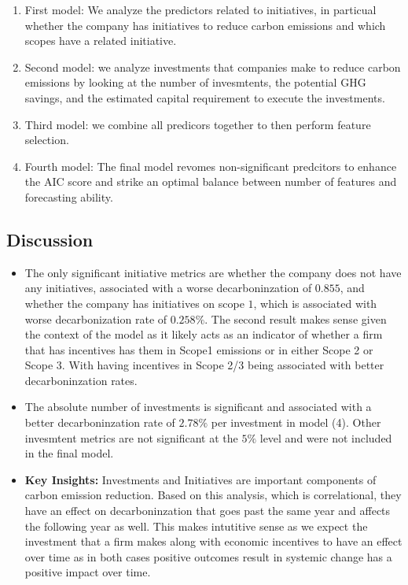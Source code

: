 \begin{enumerate}
    \item First model: We analyze the predictors related to initiatives, in particual whether the company has initiatives to reduce carbon emissions and which scopes have a related initiative. 
    \item Second model: we analyze investments that companies make to reduce carbon emissions by looking at the number of invesmtents, the potential GHG savings, and the estimated capital requirement to execute the investments.
    \item Third model: we combine all predicors together to then perform feature selection.
    \item Fourth model: The final model revomes non-significant predcitors to enhance the AIC score and strike an optimal balance between number of features and forecasting ability.
\end{enumerate}




\subsection{Discussion}

\begin{itemize}
    \item The only significant initiative metrics are whether the company does not have any initiatives, associated with a worse decarboninzation of $0.855$, and whether the company has initiatives on scope $1$, which is associated with worse decarbonization rate of $0.258\%$. The second result makes sense given the context of the model as it likely acts as an indicator of whether a firm that has incentives has them in Scope1 emissions or in either Scope 2 or Scope 3. With having incentives in Scope 2/3 being associated with better decarboninzation rates.
    \item The absolute number of investments is significant and associated with a better decarboninzation rate of $2.78\%$ per investment in model (4). Other invesmtent metrics are not significant at the $5\%$ level and were not included in the final model.
    \item \textbf{Key Insights:} Investments and Initiatives are important components of carbon emission reduction. Based on this analysis, which is correlational, they have an effect on decarboninzation that goes past the same year and affects the following year as well. This makes intutitive sense as we expect the investment that a firm makes along with economic incentives to have an effect over time as in both cases positive outcomes result in systemic change has a positive impact over time.
\end{itemize}

